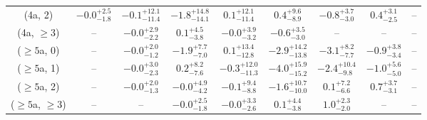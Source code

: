 \begin{table}[h!]
{\begin{tabular}{ccccccccc}
	(4a, 2) & $-0.0^{+ 2.5 }_{- 1.8 }$ & $-0.1^{+ 12.1 }_{- 11.4 }$ & $-1.8^{+ 14.8 }_{- 14.1 }$ & $0.1^{+ 12.1 }_{- 11.4 }$ & $0.4^{+ 9.6 }_{- 8.9 }$ & $-0.8^{+ 3.7 }_{- 3.0 }$ & $0.4^{+ 3.1 }_{- 2.5 }$ & -- \\[0.5ex] 
	(4a, $\ge3$) & -- & $-0.0^{+ 2.9 }_{- 2.2 }$ & $0.1^{+ 4.5 }_{- 3.8 }$ & $-0.0^{+ 3.9 }_{- 3.2 }$ & $-0.6^{+ 3.5 }_{- 3.0 }$ & -- & -- & -- \\[0.5ex] 
	($\ge5$a, 0) & -- & $-0.0^{+ 2.0 }_{- 1.2 }$ & $-1.9^{+ 7.7 }_{- 7.0 }$ & $0.1^{+ 13.4 }_{- 12.8 }$ & $-2.9^{+ 14.2 }_{- 13.8 }$ & $-3.1^{+ 8.2 }_{- 7.7 }$ & $-0.9^{+ 3.8 }_{- 3.4 }$ & -- \\[0.5ex] 
	($\ge5$a, 1) & -- & $-0.0^{+ 3.0 }_{- 2.3 }$ & $0.2^{+ 8.2 }_{- 7.6 }$ & $-0.3^{+ 12.0 }_{- 11.3 }$ & $-4.0^{+ 15.9 }_{- 15.2 }$ & $-2.4^{+ 10.4 }_{- 9.8 }$ & $-1.0^{+ 5.6 }_{- 5.0 }$ & -- \\[0.5ex] 
	($\ge5$a, 2) & -- & $-0.0^{+ 2.0 }_{- 1.3 }$ & $-0.0^{+ 4.9 }_{- 4.2 }$ & $-0.1^{+ 9.4 }_{- 8.8 }$ & $-1.6^{+ 10.7 }_{- 10.0 }$ & $0.1^{+ 7.2 }_{- 6.6 }$ & $0.7^{+ 3.7 }_{- 3.1 }$ & -- \\[0.5ex] 
	($\ge5$a, $\ge3$) & -- & -- & $-0.0^{+ 2.5 }_{- 1.8 }$ & $-0.0^{+ 3.3 }_{- 2.6 }$ & $0.1^{+ 4.4 }_{- 3.8 }$ & $1.0^{+ 2.3 }_{- 2.0 }$ & -- & -- \\[0.5ex] 
	\hline
	\hline
\end{tabular}}
\end{table}
